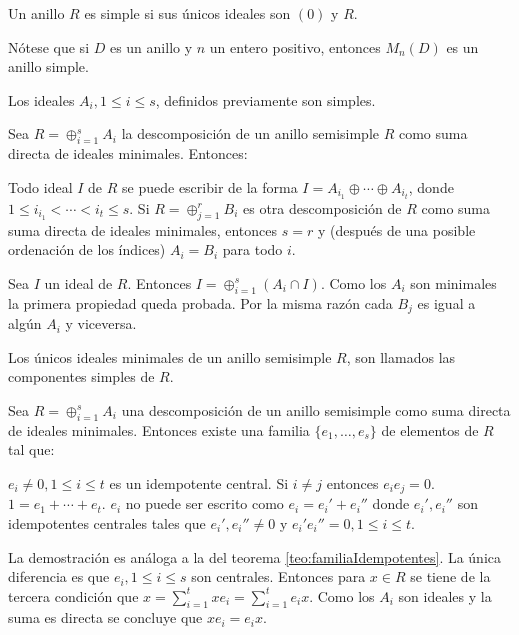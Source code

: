 \begin{definicion}
Un anillo $R$ es simple si sus únicos ideales son $(0)$ y $R$.
\end{definicion}
Nótese que si $D$ es un anillo y $n$ un entero positivo, entonces $M_n(D)$ es un anillo simple.
\begin{corolario}
Los ideales $A_i, 1\leq i \leq s$, definidos previamente son simples.
\end{corolario}
\begin{proposicion}\label{prop:unicidadDescomposicion}
Sea $R = \oplus_{i=1}^s A_i$ la descomposición de un anillo semisimple $R$ como suma directa de ideales minimales. Entonces:
\begin{bulletList}
\newItem Todo ideal $I$ de $R$ se puede escribir de la forma $I = A_{i_1} \oplus \cdots \oplus A_{i_t}$, donde $1\leq i_{i_1} < \cdots < i_{t} \leq s$.
\newItem Si $R = \oplus_{j = 1}^rB_i$ es otra descomposición de $R$ como suma suma directa de ideales minimales, entonces $s = r$ y (después de una posible ordenación de los índices) $A_i = B_i$ para todo $i$.
\end{bulletList}
\end{proposicion}
\begin{proof*}
Sea $I$ un ideal de $R$. Entonces $I = \oplus_{i = 1}^{s}(A_i \cap I)$. Como los $A_i$ son minimales la primera propiedad queda probada. Por la misma razón cada $B_j$ es igual a algún $A_i$ y viceversa. 
\end{proof*}
\begin{definicion}
Los únicos ideales minimales de un anillo semisimple $R$, son llamados las componentes simples de $R$. 
\end{definicion}
\begin{teorema}
Sea $R = \oplus_{i = 1}^sA_i$ una descomposición de un anillo semisimple como suma directa de ideales minimales. Entonces existe una familia $\{e_1, \dots, e_s \}$ de elementos de $R$ tal que:
\begin{bulletList}
\newItem $e_i \neq 0, 1\leq i  \leq t$ es un idempotente central.
\newItem Si $i \neq j$ entonces $e_ie_j = 0$.
\newItem $1 = e_1 + \cdots + e_t$.
\newItem $e_i$ no puede ser escrito como $e_i = e_i'+e_i''$ donde $e_i', e_i''$ son idempotentes centrales tales que $e_i',e_i'' \neq 0$ y $e_i'e_i'' = 0, 1\leq i \leq t$.
\end{bulletList}
\end{teorema}
\begin{proof*}
La demostración es análoga a la del teorema \ref{teo:familiaIdempotentes}. La única diferencia es que $e_i, 1\leq i \leq s$ son centrales. Entonces para $x \in R$ se tiene de la tercera condición que $x = \sum_{i=1}^{t}xe_i = \sum_{i=1}^{t}e_ix$. Como los $A_i$ son ideales y la suma es directa se concluye que $xe_i = e_ix$.
\end{proof*}
